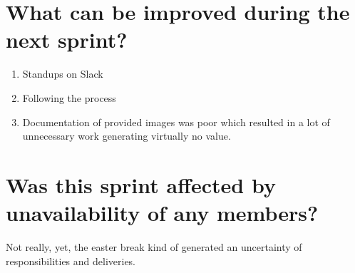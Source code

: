 \documentclass[11pt]{article}
\begin{document}
\section*{What can be improved during the next sprint?}
\begin{enumerate}
	\item Standups on Slack
	\item Following the process
	\item Documentation of provided images was poor which resulted in a lot of unnecessary work generating virtually no value.
\end{enumerate} 


\section*{Was this sprint affected by unavailability of any members?}
Not really, yet, the easter break kind of generated an uncertainty of responsibilities and deliveries.
\end{document}
